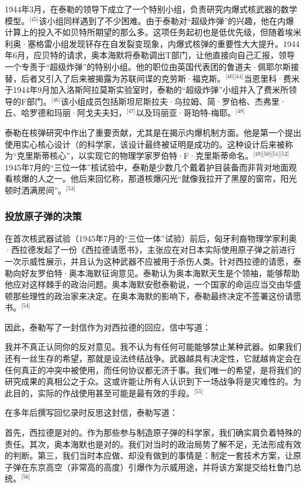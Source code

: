 1944年3月，在泰勒的领导下成立了一个特别小组，负责研究内爆式核武器的数学模型。\(^\text{[45]}\)该小组同样遇到了不少困难。由于泰勒对“超级炸弹”的兴趣，他在内爆计算上的投入不如贝特所期望的那么多。这项任务起初也是低优先级，但随着埃米利奥·塞格雷小组发现钚存在自发裂变现象，内爆式核弹的重要性大大提升。1944年6月，应贝特的请求，奥本海默将泰勒调出T部门，让他直接向自己汇报，领导一个专责于“超级炸弹”的特别小组。他的职位由英国代表团的鲁道夫·佩耶尔斯接替，后者又引入了后来被揭露为苏联间谍的克劳斯·福克斯。\(^\text{[46][44]}\)当恩里科·费米于1944年9月加入洛斯阿拉莫斯实验室时，泰勒的“超级炸弹”小组并入了费米所领导的F部门。\(^\text{[46]}\)该小组成员包括斯坦尼斯拉夫·乌拉姆、简·罗伯格、杰弗里·丘、哈罗德和玛丽·阿戈夫夫妇，\(^\text{[47]}\)以及玛丽亚·哥珀特-梅耶。\(^\text{[48]}\)

泰勒在核弹研究中作出了重要贡献，尤其是在揭示内爆机制方面。他是第一个提出使用实心核心设计（的科学家，该设计最终被证明是成功的。这种设计后来被称为“克里斯蒂核心”，以实现它的物理学家罗伯特·F·克里斯蒂命名。\(^\text{[49][50][51][52]}\)1945年7月的“三位一体”核试验中，泰勒是少数几个戴着护目装备而非背对地面观看核爆的人之一。他后来回忆称，那道核爆闪光“就像我拉开了黑屋的窗帘，阳光顿时洒满房间”。\(^\text{[53]}\)
\subsubsection{投放原子弹的决策}
在首次核武器试验（1945年7月的“三位一体”试验）前后，匈牙利裔物理学家利奥·西拉德发起了一份《西拉德请愿书》，主张应在对日本实际使用原子弹之前进行一次示威性展示，并且认为这种武器不应被用于杀伤人类。针对西拉德的请愿，泰勒向好友罗伯特·奥本海默征询意见。泰勒认为奥本海默天生是个领袖，能够帮助他应对这样棘手的政治问题。奥本海默安慰泰勒说，一个国家的命运应当交由华盛顿那些理性的政治家来决定。在奥本海默的影响下，泰勒最终决定不签署这份请愿书。\(^\text{[54]}\)

因此，泰勒写了一封信作为对西拉德的回应，信中写道：

我并不真正认同你的反对意见。我不认为有任何可能能够禁止某种武器。如果我们还有一丝生存的希望，那就是设法终结战争。武器越具有决定性，它就越肯定会在任何真正的冲突中被使用，而任何协议都无济于事。我们唯一的希望，是将我们的研究成果的真相公之于众。这或许能让所有人认识到下一场战争将是灾难性的。为此目的，实际的作战使用甚至可能是最有效的手段。\(^\text{[55]}\)

在多年后撰写回忆录时反思这封信，泰勒写道：

首先，西拉德是对的。作为那些参与制造原子弹的科学家，我们确实肩负着特殊的责任。其次，奥本海默也是对的。我们对当时的政治局势了解不足，无法形成有效的判断。第三，我们当时本应做、却没有做到的事情是：制定一套技术方案，让原子弹在东京高空（非常高的高度）引爆作为示威用途，并将该方案提交给杜鲁门总统。\(^\text{[56]}\)

